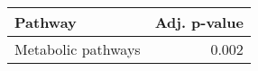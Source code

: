 \begin{tabular}{lr}
\toprule
            Pathway &  Adj. p-value \\
\midrule
 Metabolic pathways &         0.002 \\
\bottomrule
\end{tabular}
